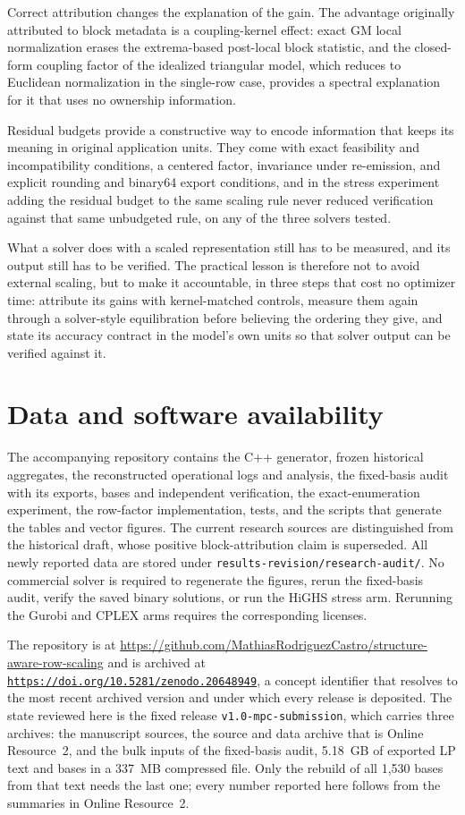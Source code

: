 \documentclass[smallextended,envcountsect,envcountsame]{svjour3}
\newcommand{\doi}[1]{\href{https://doi.org/#1}{\nolinkurl{https://doi.org/#1}}}
\begin{document}
Correct attribution changes the explanation of the gain. The advantage originally attributed to
block metadata is a coupling-kernel effect: exact GM local normalization erases the
extrema-based post-local block statistic, and the closed-form coupling factor of the idealized
triangular model, which reduces to Euclidean normalization in the single-row case, provides a
spectral explanation for it that uses no ownership information.

Residual budgets provide a constructive way to encode information that keeps its meaning in
original application units. They come with exact feasibility and incompatibility conditions, a
centered factor, invariance under re-emission, and explicit rounding and binary64 export
conditions, and in the stress experiment adding the residual budget to the same scaling rule
never reduced verification against that same unbudgeted rule, on any of the three solvers
tested.

What a solver does with a scaled representation still has to be measured, and its output still
has to be verified. The practical lesson is therefore not to avoid external scaling, but to make
it accountable, in three steps that cost no optimizer time: attribute its gains with
kernel-matched controls, measure them again through a solver-style equilibration before
believing the ordering they give, and state its accuracy contract in the model's own units so
that solver output can be verified against it.

\section*{Data and software availability}
The accompanying repository contains the C++ generator, frozen historical aggregates, the
reconstructed operational logs and analysis, the fixed-basis audit with its exports, bases and
independent verification, the exact-enumeration experiment, the row-factor implementation,
tests, and the scripts that generate the tables and vector figures. The current research
sources are distinguished from the historical draft, whose positive block-attribution claim is
superseded. All newly reported data are stored under
\texttt{results-revision/research-audit/}. No commercial solver is required to regenerate the
figures, rerun the fixed-basis audit, verify the saved binary solutions, or run the HiGHS stress
arm. Rerunning the Gurobi and CPLEX arms requires the corresponding licenses.

The repository is at \url{https://github.com/MathiasRodriguezCastro/structure-aware-row-scaling}
and is archived at \doi{10.5281/zenodo.20648949}, a concept identifier that resolves to the
most recent archived version and under which every release is deposited.
The state reviewed here is the fixed release \texttt{v1.0-mpc-submission}, which carries three
archives: the manuscript sources, the source and data archive that is Online Resource~2, and the
bulk inputs of the fixed-basis audit, 5.18~GB of exported LP text and bases in a 337~MB
compressed file. Only the rebuild of all 1,530 bases from that text needs the last one; every
number reported here follows from the summaries in Online Resource~2.
\end{document}
